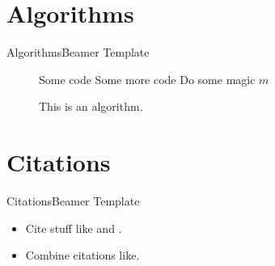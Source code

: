\documentclass[hyperref={pdfpagemode=UseOutlines}]{beamer}
\numberwithin{equation}{mycounter} %
\numberwithin{table}{mycounter}
\begin{document}
\section{Algorithms}
\begin{frame}{Algorithms}{Beamer Template}
    \begin{figure}
        \centering
        \begin{minipage}{0.8\linewidth}
            \begin{algorithm}[H]
                \caption{This is an algorithm.}
                \label{algo1}

                {
                    Some code\;
                    Some more code\; \label{line1}
                }
                {
                    {
                        Do some magic\;
                    }
                    \Else
                    {
                        \Return $m$\;
                    }
                }
            \end{algorithm}
        \end{minipage}
    \end{figure}
\end{frame}

\section{Citations}
\begin{frame}{Citations}{Beamer Template}
    \begin{itemize}
        \item Cite stuff like \cite{article} and \cite{misc}.
        \item Combine citations like\cite{book,incollection}.
    \end{itemize}
\end{frame}
\end{document}
